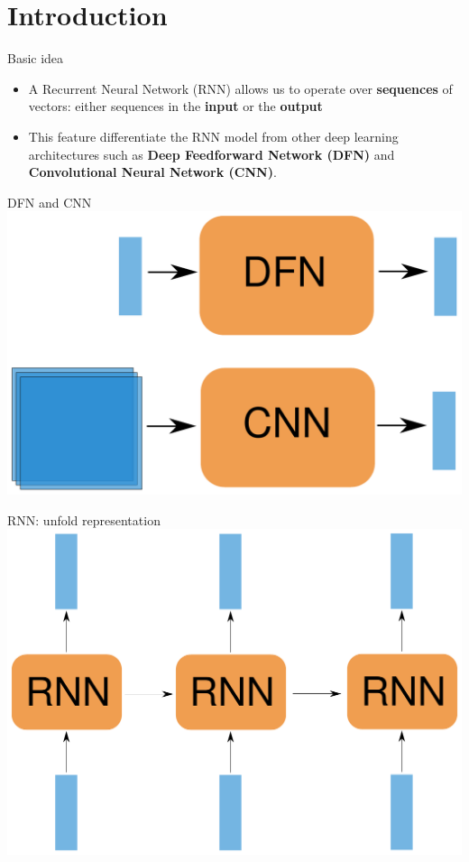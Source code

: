 \documentclass[10pt]{beamer}
\begin{document}
\maketitle

\section{Introduction}

\begin{frame}[fragile]{Basic idea}
\begin{itemize}
\item A \alert{Recurrent Neural Network (RNN)} allows us to operate over \textbf{sequences} of vectors: either sequences in the \textbf{input} or the \textbf{output} 
\vspace{0.5cm}
\item This feature differentiate the RNN model from other deep learning architectures such as \textbf{Deep Feedforward Network (DFN)} and \textbf{Convolutional Neural Network (CNN)}.
\end{itemize}
\end{frame}

\begin{frame}[fragile]{DFN and CNN}
\includegraphics[scale=0.5]{images/DfnCnn.pdf}
\end{frame}

\begin{frame}[fragile]{RNN: unfold representation}
\includegraphics[scale=0.5]{images/RNNnaive1.pdf}
\end{frame}
\end{document}
